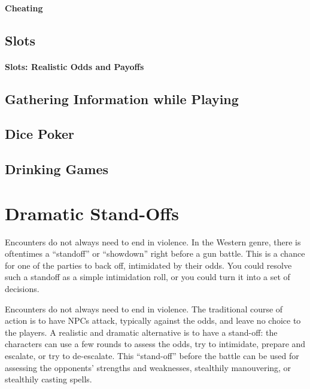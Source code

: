 \documentclass[twocolumn]{dndbook}
\begin{document}
\paragraph{Cheating}
\subsection{Slots}

\paragraph{Slots: Realistic Odds and Payoffs}

\subsection{Gathering Information while Playing}

\subsection{Dice Poker}


\subsection{Drinking Games}

\section{Dramatic Stand-Offs}
\label{sec:dramatic_standoff}


Encounters do not always need to end in violence.
In the Western genre, there is oftentimes a ``standoff'' or ``showdown'' right before a gun battle.
This is a chance for one of the parties to back off, intimidated by their odds.
You could resolve such a standoff as a simple intimidation roll, or you could turn it into a set of decisions.\par

\begin{emphasisParagraph}
	Encounters do not always need to end in violence.
	The traditional course of action is to have NPCs attack, typically against the odds, and leave no choice to the players.
	A realistic and dramatic alternative is to have a stand-off: the characters can use a few rounds to assess the odds,
	try to intimidate, prepare and escalate, or try to de-escalate.
	This ``stand-off'' before the battle can be used for assessing the opponents' strengths and weaknesses,
	stealthily manouvering, or stealthily casting spells.
\end{emphasisParagraph}
\end{document}
